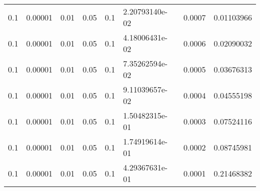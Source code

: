 \begin{table}
\begin{tabular}{ccc}
          0.1 &        0.00001 &             0.01 &     0.05 &              0.1 &  2.20793140e-02 &           0.0007 &         0.01103966 \\
          0.1 &        0.00001 &             0.01 &     0.05 &              0.1 &  4.18006431e-02 &           0.0006 &         0.02090032 \\
          0.1 &        0.00001 &             0.01 &     0.05 &              0.1 &  7.35262594e-02 &           0.0005 &         0.03676313 \\
          0.1 &        0.00001 &             0.01 &     0.05 &              0.1 &  9.11039657e-02 &           0.0004 &         0.04555198 \\
          0.1 &        0.00001 &             0.01 &     0.05 &              0.1 &  1.50482315e-01 &           0.0003 &         0.07524116 \\
          0.1 &        0.00001 &             0.01 &     0.05 &              0.1 &  1.74919614e-01 &           0.0002 &         0.08745981 \\
          0.1 &        0.00001 &             0.01 &     0.05 &              0.1 &  4.29367631e-01 &           0.0001 &         0.21468382 \\
\end{tabular}
\end{table}
